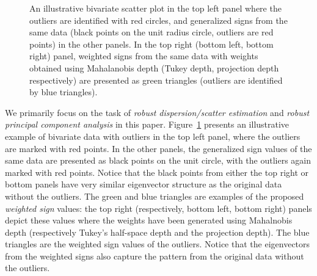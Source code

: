 \begin{figure}[t]
\begin{center}
\caption{
An illustrative bivariate scatter plot in the top left panel where the outliers are 
identified with red circles, 
and generalized signs from the same data (black points on the 
unit radius circle, outliers are red points) in the other panels. 
In the top right (bottom left, bottom right) 
panel, weighted signs from the same data with weights obtained using Mahalanobis depth 
(Tukey depth, projection depth respectively) are presented as green triangles 
(outliers are identified by blue triangles). 
}
\label{fig:Fig1}
\end{center}
\end{figure}

We primarily focus on the task of \textit{robust dispersion/scatter estimation} and 
\textit{robust principal component analysis} in this paper. Figure~\ref{fig:Fig1} presents an illustrative example of bivariate data with outliers in the top left panel, where the outliers are marked with red points. In the 
other panels, the generalized sign values of the same data are presented as black points 
on the unit circle, with the outliers again marked with red points. Notice that the 
black points from either the top right or bottom panels have very similar eigenvector 
structure as the original data without the outliers. The green and blue triangles 
are examples of 
the proposed \textit{weighted sign} values: the top right (respectively, bottom left, 
bottom right) panels depict these values where the weights have been generated using 
Mahalnobis depth (respectively Tukey's half-space depth and the projection depth). The 
blue triangles are the weighted sign values of the outliers. Notice that the eigenvectors 
from the weighted signs also capture the pattern from the original data without the 
outliers.

